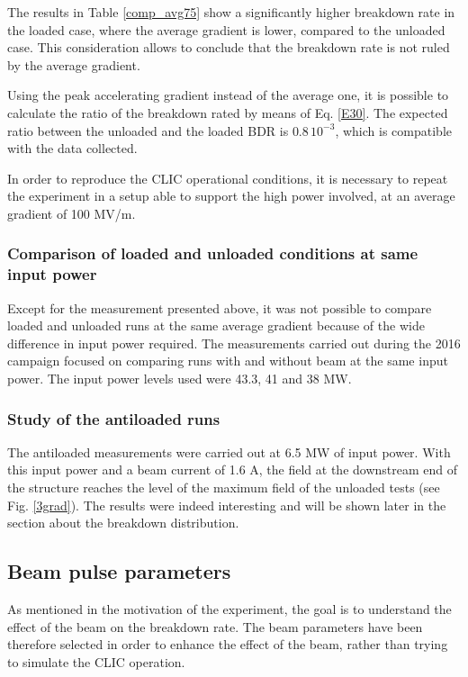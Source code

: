 The results in Table \ref{comp_avg75} show a significantly higher breakdown rate in the loaded case, where the average gradient is lower, compared to the unloaded case. This consideration allows to conclude that the breakdown rate is not ruled by the average gradient.

Using the peak accelerating gradient instead of the average one, it is possible to calculate the ratio of the breakdown rated by means of Eq. \ref{E30}. The expected ratio between the unloaded and the loaded BDR is $0.8\,10^{-3}$, which is compatible with the data collected. 

In order to reproduce the CLIC operational conditions, it is necessary to repeat the experiment in a setup able to support the high power involved, at an average gradient of 100 MV/m.



\subsubsection{Comparison of loaded and unloaded conditions at same input power}

Except for the measurement presented above, it was not possible to compare loaded and unloaded runs at the same average gradient because of the wide difference in input power required. The measurements carried out during the 2016 campaign focused on comparing runs with and without beam at the same input power.  The input power levels used were 43.3, 41 and 38 MW. 

\subsubsection{Study of the antiloaded runs}

The antiloaded measurements were carried out at 6.5 MW of input power. With this input power and a beam current of 1.6 A, the field at the downstream end of the structure reaches the level of the maximum field of the unloaded tests (see Fig. \ref{3grad}). The results were indeed interesting and will be shown later in the section about the breakdown distribution. 




\subsection[Beam pulse parameters]{Beam pulse parameters}

As mentioned in the motivation of the experiment, the goal is to understand the effect of the beam on the breakdown rate. The beam parameters have been therefore selected in order to enhance the effect of the beam, rather than trying to simulate the CLIC operation. 

